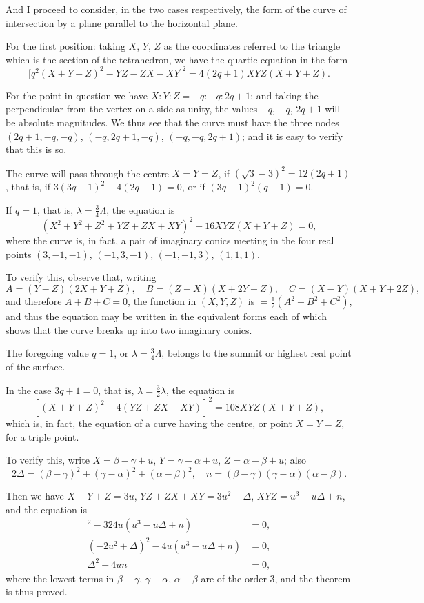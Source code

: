 \documentclass[12pt,a4paper]{article}
\theoremstyle{plain}
\theoremstyle{definition}
\begin{document}
And I proceed to consider, in the two cases respectively, the form of the curve of intersection by a plane parallel to the horizontal plane.

For the first position: taking $X$, $Y$, $Z$ as the coordinates referred to the triangle which is the section of the tetrahedron, we have the quartic equation in the form
\[
\bigl[q^2(X + Y + Z)^2 - YZ - ZX - XY\bigr]^2 = 4(2q + 1)XYZ(X + Y + Z).
\]

For the point in question we have $X : Y : Z = -q : -q : 2q + 1$; and taking the perpendicular from the vertex on a side as unity, the values $-q$, $-q$, $2q + 1$ will be absolute magnitudes. We thus see that the curve must have the three nodes $(2q+1, -q, -q)$, $(-q, 2q + 1, -q)$, $(-q, -q, 2q + 1)$; and it is easy to verify that this is so.

The curve will pass through the centre $X = Y = Z$, if $(\sqrt{3} - 3)^2 = 12(2q + 1)$, that is, if $3(3q - 1)^2 - 4(2q + 1) = 0$, or if $(3q + 1)^2(q - 1) = 0$.

If $q = 1$, that is, $\lambda = \tfrac{3}{4}\Lambda$, the equation is
\[
(X^2 + Y^2 + Z^2 + YZ + ZX + XY)^2 - 16XYZ(X + Y + Z) = 0,
\]
where the curve is, in fact, a pair of imaginary conics meeting in the four real points $(3, -1, -1)$, $(-1, 3, -1)$, $(-1, -1, 3)$, $(1, 1, 1)$.

To verify this, observe that, writing
\[
A = (Y - Z)(2X + Y + Z),\quad B = (Z - X)(X + 2Y + Z),\quad C = (X - Y)(X + Y + 2Z),
\]
and therefore $A + B + C = 0$, the function in $(X, Y, Z)$ is $= \tfrac{1}{2}(A^2 + B^2 + C^2)$, and thus the equation may be written in the equivalent forms each of which shows that the curve breaks up into two imaginary conics.

The foregoing value $q = 1$, or $\lambda = \tfrac{3}{4}\Lambda$, belongs to the summit or highest real point of the surface.

\newpage
\setcounter{page}{3}

In the case $3q + 1 = 0$, that is, $\lambda = \tfrac{3}{2}\lambda$, the equation is
\[
[(X + Y + Z)^2 - 4(YZ + ZX + XY)]^2 = 108XYZ(X + Y + Z),
\]
which is, in fact, the equation of a curve having the centre, or point $X = Y = Z$, for a triple point.

To verify this, write $X = \beta - \gamma + u$, $Y = \gamma - \alpha + u$, $Z = \alpha - \beta + u$; also
\[
2\Delta = (\beta - \gamma)^2 + (\gamma - \alpha)^2 + (\alpha - \beta)^2,\quad n = (\beta - \gamma)(\gamma - \alpha)(\alpha - \beta).
\]

Then we have $X + Y + Z = 3u$, $YZ + ZX + XY = 3u^2 - \Delta$, $XYZ = u^3 - u\Delta + n$, and the equation is
\begin{align*}
[9u^2 - 9(3u^2 - \Delta)]^2 - 324u(u^3 - u\Delta + n) &= 0,\\
(-2u^2 + \Delta)^2 - 4u(u^3 - u\Delta + n) &= 0,\\
\Delta^2 - 4un &= 0,
\end{align*}
where the lowest terms in $\beta - \gamma$, $\gamma - \alpha$, $\alpha - \beta$ are of the order 3, and the theorem is thus proved.
\end{document}
